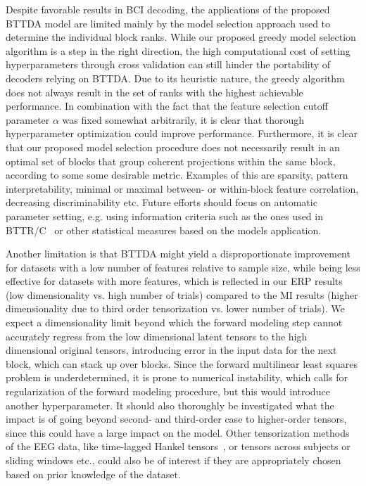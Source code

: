 \documentclass[twocolumn]{article}
\begin{document}
Despite favorable results in BCI decoding, the applications of the proposed
\textsc{BTTDA} model are limited mainly by the model selection approach used
to determine the individual block ranks.
While our proposed greedy model selection algorithm is a step in the right
direction, the high computational cost of setting hyperparameters through cross
validation can still hinder the portability of decoders relying on
\textsc{BTTDA}.
Due to its heuristic nature, the greedy algorithm does not always result in the
set of ranks with the highest achievable performance.
In combination with the fact that the feature selection cutoff parameter
$\alpha$ was fixed somewhat arbitrarily, it is clear that thorough
hyperparameter optimization could improve performance.
Furthermore, it is clear that our proposed model selection procedure does not
necessarily result in an optimal set of blocks that group coherent projections
within the same block, according to some some desirable metric.
Examples of this are sparsity, pattern interpretability, minimal or maximal between- or within-block feature
correlation, decreasing discriminability etc.
Future efforts should focus on automatic parameter setting, e.g. using
information criteria such as the ones used in BTTR/C~\cite{Faes2022} or other
statistical measures based on the models application.

Another limitation is that \textsc{BTTDA} might yield a disproportionate
improvement for datasets with a low number of features relative to sample size,
while being less effective for datasets with more features, which is reflected
in our ERP results (low dimensionality vs. high number of trials) compared to the
MI results (higher dimensionality due to third order tensorization vs. lower
number of trials).
We expect a dimensionality limit beyond which the forward modeling step cannot
accurately regress from the low dimensional latent tensors to the high
dimensional original tensors, introducing
error in the input data for the next block, which can stack up over blocks.
Since the forward multilinear least squares problem is underdetermined, it is prone to
numerical instability, which calls for regularization of the forward modeling
procedure, but this would introduce another hyperparameter.
It should also thoroughly be investigated what the impact is of going beyond
second- and third-order case to higher-order tensors, since this could have a large impact
on the model.
Other tensorization methods of the EEG data, like time-lagged Hankel
tensors~\cite{Papy2005}, or tensors across subjects or sliding windows etc., could also be
of interest if they are appropriately chosen based on prior knowledge of the dataset.
\end{document}
